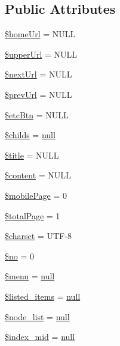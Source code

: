 \subsection*{Public Attributes}
\begin{DoxyCompactItemize}
\item 
\hyperlink{classmobileXE_abff078bb36c02394447e55be4500b762}{\$home\+Url} = N\+U\+LL
\item 
\hyperlink{classmobileXE_a643b9ca5393066afea26819e4f1cf115}{\$upper\+Url} = N\+U\+LL
\item 
\hyperlink{classmobileXE_adbdb5909b975bb776f91817d2392aaca}{\$next\+Url} = N\+U\+LL
\item 
\hyperlink{classmobileXE_acbc08c3fe06a6a5aaae6cbdc8738559f}{\$prev\+Url} = N\+U\+LL
\item 
\hyperlink{classmobileXE_adac4ec3b5f46d10ac063ccba83f8ffa7}{\$etc\+Btn} = N\+U\+LL
\item 
\hyperlink{classmobileXE_ae641a3f98d4d95afe77f56456532aff7}{\$childs} = \hyperlink{modernizr_8min_8js_a286f9ec831c5e676eeb493248eab9575}{null}
\item 
\hyperlink{classmobileXE_aeb2ef82029883fd60174e3d0e9f7dcc3}{\$title} = N\+U\+LL
\item 
\hyperlink{classmobileXE_a827bc8119bac862a05a1c192125bf125}{\$content} = N\+U\+LL
\item 
\hyperlink{classmobileXE_a4017307825d19d450c677b25b70eab5e}{\$mobile\+Page} = 0
\item 
\hyperlink{classmobileXE_a0d7bcada3689f84f67337d02c8dd6f21}{\$total\+Page} = 1
\item 
\hyperlink{classmobileXE_ae49d948fe651953a56bac2a907f6057a}{\$charset} = \textquotesingle{}U\+TF-\/8\textquotesingle{}
\item 
\hyperlink{classmobileXE_a497e828014cdb6eaef56dd42d0f816e6}{\$no} = 0
\item 
\hyperlink{classmobileXE_a0ebb4296d28c9cb49fabb4d1252c1434}{\$menu} = \hyperlink{modernizr_8min_8js_a286f9ec831c5e676eeb493248eab9575}{null}
\item 
\hyperlink{classmobileXE_abd07e5909154b43a31e2ebff5d51e4c7}{\$listed\+\_\+items} = \hyperlink{modernizr_8min_8js_a286f9ec831c5e676eeb493248eab9575}{null}
\item 
\hyperlink{classmobileXE_af906479c52f412d0beae2252bad4ef35}{\$node\+\_\+list} = \hyperlink{modernizr_8min_8js_a286f9ec831c5e676eeb493248eab9575}{null}
\item 
\hyperlink{classmobileXE_a9e93ed38eed50085338e8128ab4015ab}{\$index\+\_\+mid} = \hyperlink{modernizr_8min_8js_a286f9ec831c5e676eeb493248eab9575}{null}

\end{DoxyCompactItemize}
